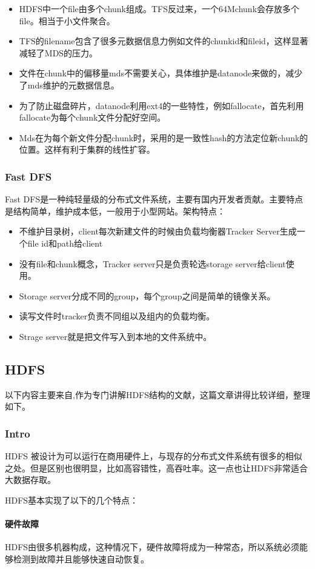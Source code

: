 \documentclass[UTF8]{ctexart}
\begin{document}
\begin{itemize}
\item HDFS中一个file由多个chunk组成。TFS反过来，一个64Mchunk会存放多个file。相当于小文件聚合。
\item TFS的filename包含了很多元数据信息力例如文件的chunkid和fileid，这样显著减轻了MDS的压力。
\item 文件在chunk中的偏移量mds不需要关心，具体维护是datanode来做的，减少了mds维护的元数据信息。
\item 为了防止磁盘碎片，datanode利用ext4的一些特性，例如fallocate，首先利用fallocate为每个chunk文件分配好空间。
\item Mds在为每个新文件分配chunk时，采用的是一致性hash的方法定位新chunk的位置。这样有利于集群的线性扩容。
\end{itemize}

\subsubsection{Fast DFS}
Fast DFS是一种纯轻量级的分布式文件系统，主要有国内开发者贡献。主要特点是结构简单，维护成本低，一般用于小型网站。架构特点：

\begin{itemize}
\item 不维护目录树，client每次新建文件的时候由负载均衡器Tracker Server生成一个file id和path给client
\item 没有file和chunk概念，Tracker server只是负责轮选storage server给client使用。
\item Storage server分成不同的group，每个group之间是简单的镜像关系。
\item 读写文件时tracker负责不同组以及组内的负载均衡。
\item Strage server就是把文件写入到本地的文件系统中。
\end{itemize}


\subsection{HDFS}
以下内容主要来自\cite{Dhruba},作为专门讲解HDFS结构的文献，这篇文章讲得比较详细，整理如下。
\subsubsection{Intro}
HDFS 被设计为可以运行在商用硬件上，与现存的分布式文件系统有很多的相似之处。但是区别也很明显，比如高容错性，高吞吐率。这一点也让HDFS非常适合大数据存取。

HDFS基本实现了以下的几个特点：
\paragraph{硬件故障}
HDFS由很多机器构成，这种情况下，硬件故障将成为一种常态，所以系统必须能够检测到故障并且能够快速自动恢复。
\end{document}
